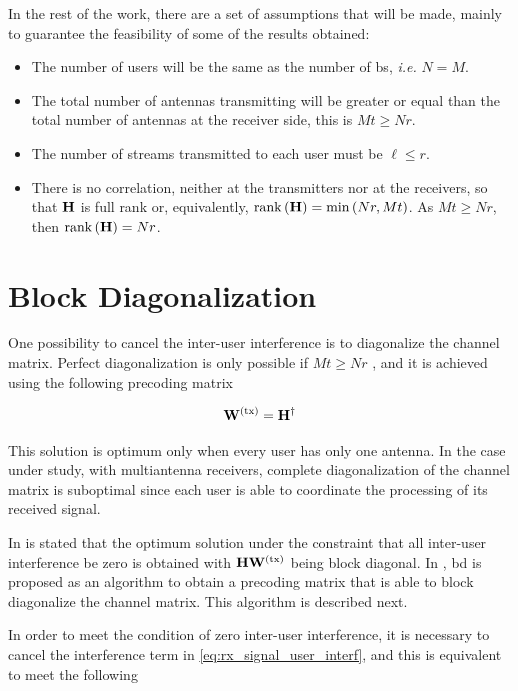 In the rest of the work, there are a set of assumptions that will be made,
mainly to guarantee the feasibility of some of the results obtained:

\begin{itemize}
    \item The number of users will be the same as the number of \gls{bs},
        \emph{i.e.} $N = M$.
    \item The total number of antennas transmitting will be greater or equal
        than the total number of antennas at the receiver side, this is $Mt
		\geq Nr$.
    \item The number of streams transmitted to each user must be $\ell \leq r$.
    \item There is no correlation, neither at the transmitters nor at the
        receivers, so that $\mathbf{H}$ is full rank or, equivalently, $\operatorname*{rank}\left(
        \mathbf{H}\right) = \min\left(Nr,Mt\right)$. As $Mt \geq Nr$, then $\operatorname*{rank}\left(
        \mathbf{H}\right) = Nr$.
\end{itemize}

\section{Block Diagonalization}\label{sec:bd}

One possibility to cancel the inter-user interference is to diagonalize the
channel matrix. Perfect diagonalization is only possible if $Mt \geq Nr$
\cite{caire03}, and it is achieved using the following precoding matrix

\begin{equation} \label{eq:zf_precod}
    \mathbf{W}^{(\text{tx})} = \mathbf{H}^\dagger
\end{equation}

This solution is optimum only when every user has only one antenna. In the case
under study, with multiantenna receivers, complete diagonalization of the
channel matrix is suboptimal since each user is able to coordinate the
processing of its received signal.

In \cite{spencer04} is stated that the optimum solution under the constraint
that all inter-user interference be zero is obtained with $\mathbf{H} \mathbf{W}^{(\text{tx})}$ being
block diagonal. In \cite{spencer04}, \gls{bd} is proposed as an algorithm to
obtain a precoding matrix that is able to block diagonalize the channel matrix.
This algorithm is described next.

In order to meet the condition of zero inter-user interference, it is necessary
to cancel the interference term in \eqref{eq:rx_signal_user_interf}, and this
is equivalent to meet the following

